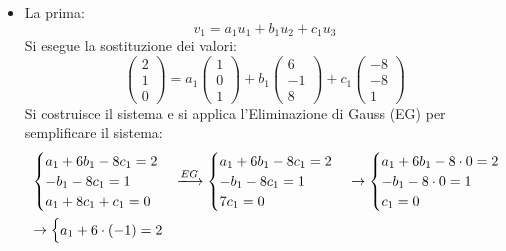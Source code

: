\documentclass[a4paper]{article}
\begin{document}
	\begin{itemize}
		\item La prima:
		\begin{equation*}
			v_{1} = a_{1} u_{1} + b_{1} u_{2} + c_{1} u_{3}
		\end{equation*}
		Si esegue la sostituzione dei valori:
		\begin{equation*}
			\begin{pmatrix}
				2 \\ 1 \\ 0
			\end{pmatrix} =
			a_{1} \begin{pmatrix}
				1 \\ 0 \\ 1
			\end{pmatrix} +
			b_{1} \begin{pmatrix}
				6 \\ -1 \\ 8
			\end{pmatrix} +
			c_{1} \begin{pmatrix}
				-8 \\ -8 \\ 1
			\end{pmatrix}
		\end{equation*}
		Si costruisce il sistema e si applica l'Eliminazione di Gauss (EG) per semplificare il sistema:
		\begin{equation*}
			\begin{array}{l}
				\begin{cases}
					a_{1} + 6b_{1} - 8c_{1} = 2 \\
					-b_{1} - 8c_{1} = 1 \\
					a_{1} + 8c_{1} + c_{1} = 0
				\end{cases} \xlongrightarrow{EG}
				\begin{cases}
					a_{1} + 6b_{1} - 8c_{1} = 2 \\
					-b_{1} - 8c_{1} = 1 \\
					7c_{1} = 0
				\end{cases} \rightarrow
				\begin{cases}
					a_{1} + 6b_{1} - 8\cdot0 = 2 \\
					-b_{1} - 8\cdot0 = 1 \\
					c_{1} = 0
				\end{cases} \\ [2em]
				\rightarrow \begin{cases}
					a_{1} + 6 \cdot \left(-1\right) = 2 \\

\end{cases}
\end{array}
\end{equation*}
\end{itemize}
\end{document}
